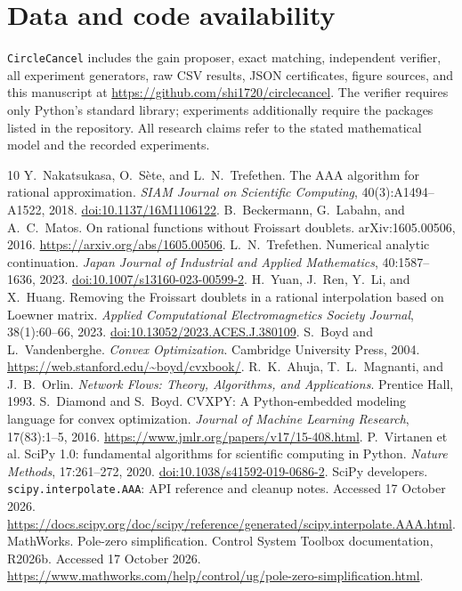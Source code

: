 \documentclass[11pt]{article}
\theoremstyle{definition}\newtheorem{definition}[theorem]{Definition}
\begin{document}
\section*{Data and code availability}
\texttt{CircleCancel} includes the gain proposer, exact matching, independent verifier, all experiment generators, raw CSV results, JSON certificates, figure sources, and this manuscript at \url{https://github.com/shi1720/circlecancel}. The verifier requires only Python's standard library; experiments additionally require the packages listed in the repository. All research claims refer to the stated mathematical model and the recorded experiments.

\begin{thebibliography}{10}\small
{} Y.~Nakatsukasa, O.~S\`ete, and L.~N.~Trefethen. The AAA algorithm for rational approximation. \emph{SIAM Journal on Scientific Computing}, 40(3):A1494--A1522, 2018. \href{https://doi.org/10.1137/16M1106122}{doi:10.1137/16M1106122}.
 B.~Beckermann, G.~Labahn, and A.~C.~Matos. On rational functions without Froissart doublets. arXiv:1605.00506, 2016. \url{https://arxiv.org/abs/1605.00506}.
 L.~N.~Trefethen. Numerical analytic continuation. \emph{Japan Journal of Industrial and Applied Mathematics}, 40:1587--1636, 2023. \href{https://doi.org/10.1007/s13160-023-00599-2}{doi:10.1007/s13160-023-00599-2}.
 H.~Yuan, J.~Ren, Y.~Li, and X.~Huang. Removing the Froissart doublets in a rational interpolation based on Loewner matrix. \emph{Applied Computational Electromagnetics Society Journal}, 38(1):60--66, 2023. \href{https://doi.org/10.13052/2023.ACES.J.380109}{doi:10.13052/2023.ACES.J.380109}.
 S.~Boyd and L.~Vandenberghe. \emph{Convex Optimization}. Cambridge University Press, 2004. \url{https://web.stanford.edu/~boyd/cvxbook/}.
 R.~K.~Ahuja, T.~L.~Magnanti, and J.~B.~Orlin. \emph{Network Flows: Theory, Algorithms, and Applications}. Prentice Hall, 1993.
 S.~Diamond and S.~Boyd. CVXPY: A Python-embedded modeling language for convex optimization. \emph{Journal of Machine Learning Research}, 17(83):1--5, 2016. \url{https://www.jmlr.org/papers/v17/15-408.html}.
 P.~Virtanen et al. SciPy 1.0: fundamental algorithms for scientific computing in Python. \emph{Nature Methods}, 17:261--272, 2020. \href{https://doi.org/10.1038/s41592-019-0686-2}{doi:10.1038/s41592-019-0686-2}.
 SciPy developers. \texttt{scipy.interpolate.AAA}: API reference and cleanup notes. Accessed 17 October 2026. \url{https://docs.scipy.org/doc/scipy/reference/generated/scipy.interpolate.AAA.html}.
 MathWorks. Pole-zero simplification. Control System Toolbox documentation, R2026b. Accessed 17 October 2026. \url{https://www.mathworks.com/help/control/ug/pole-zero-simplification.html}.
\end{thebibliography}
\end{document}
